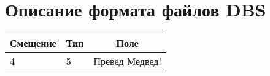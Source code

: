 
\chapter{
  Описание формата файлов DBS
}
\label{app:dbs}

\newcommand{\dbsRecord}[1]{
  \noindent
  \begin{tabularx}{\textwidth}{|p{3em}|p{4em}|X|}
    \hline
    \multicolumn{1}{|c|}{Смещение} &
    \multicolumn{1}{c|}{Тип}      &
    \multicolumn{1}{c|}{Поле}     \\
    \hline
    #1
    \\
    \hline
  \end{tabularx}
}

\dbsRecord{
  4 & 5 & Превед Медвед!
}
